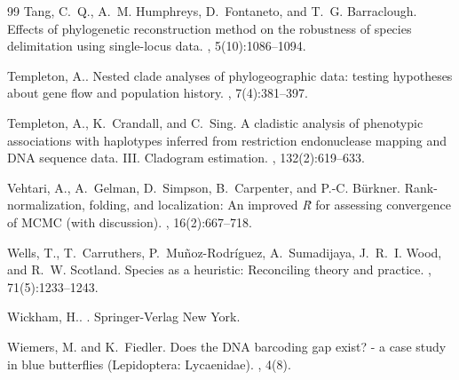 \documentclass[12pt]{article}
\begin{document}
\begin{thebibliography}{99}
Tang, C.~Q., A.~M. Humphreys, D.~Fontaneto, and T.~G.
  Barraclough\leavevmode\nopagebreak{}.
\newblock Effects of phylogenetic reconstruction method on the robustness of
  species delimitation using single-locus data.
, 5(10):1086--1094.

Templeton, A.\leavevmode\nopagebreak{}.
\newblock Nested clade analyses of phylogeographic data: testing hypotheses
  about gene flow and population history.
, 7(4):381--397.

Templeton, A., K.~Crandall, and C.~Sing\leavevmode\nopagebreak{}.
\newblock A cladistic analysis of phenotypic associations with haplotypes
  inferred from restriction endonuclease mapping and {DNA} sequence data.
  {III}. {C}ladogram estimation.
, 132(2):619--633.

Vehtari, A., A.~Gelman, D.~Simpson, B.~Carpenter, and P.-C.
  B{\"u}rkner\leavevmode\nopagebreak{}.
\newblock Rank-normalization, folding, and localization: {A}n improved
  \textit{{{\^ R}}} for assessing convergence of {MCMC} (with discussion).
, 16(2):667--718.

Wells, T., T.~Carruthers, P.~Muñoz-Rodríguez, A.~Sumadijaya, J.~R.~I. Wood,
  and R.~W. Scotland\leavevmode\nopagebreak{}.
\newblock Species as a heuristic: Reconciling theory and practice.
, 71(5):1233--1243.

Wickham, H.\leavevmode\nopagebreak{}.
.
\newblock Springer-Verlag New York.

Wiemers, M. and K.~Fiedler\leavevmode\nopagebreak{}.
\newblock Does the {DNA} barcoding gap exist? - a case study in blue
  butterflies ({L}epidoptera: {L}ycaenidae).
, 4(8).


\end{thebibliography}
\end{document}
